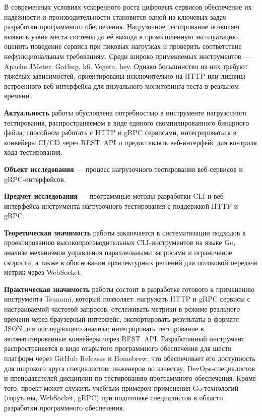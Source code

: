 В современных условиях ускоренного роста цифровых сервисов обеспечение
их надёжности и производительности становится одной из ключевых задач разработки
программного обеспечения.
Нагрузочное тестирование позволяет выявить узкие места системы до её выхода
в промышленную эксплуатацию, оценить поведение сервиса при пиковых нагрузках
и проверить соответствие нефункциональным требованиям.
Среди широко применяемых инструментов --- Apache JMeter, Gatling, k6, Vegeta, hey.
Однако большинство из них требуют тяжёлых зависимостей,
ориентированы исключительно на HTTP или лишены встроенного веб-интерфейса
для визуального мониторинга теста в реальном времени.

\textbf{Актуальность} работы обусловлена потребностью в инструменте
нагрузочного тестирования, распространяемом в виде единого скомпилированного
бинарного файла, способном работать с HTTP и gRPC сервисами,
интегрироваться в конвейеры CI/CD через REST~API
и предоставлять веб-интерфейс для контроля хода тестирования.

\textbf{Объект исследования} --- процесс нагрузочного тестирования веб-сервисов
и gRPC-интерфейсов.

\textbf{Предмет исследования} --- программные методы разработки CLI
и веб-интерфейса инструмента нагрузочного тестирования с поддержкой HTTP и gRPC.

\textbf{Теоретическая значимость} работы заключается в систематизации подходов
к проектированию высокопроизводительных CLI-инструментов на языке Go,
анализе механизмов управления параллельными запросами
и ограничение скорости, а также в обосновании архитектурных решений
для потоковой передачи метрик через WebSocket.

\textbf{Практическая значимость} работы состоит в разработке готового к применению
инструмента Tsunami, который позволяет:
нагружать HTTP и gRPC сервисы с настраиваемой частотой запросов;
отслеживать метрики
в режиме реального времени через браузерный интерфейс;
экспортировать результаты в формате JSON для последующего анализа;
интегрировать тестирование в автоматизированные конвейеры через REST~API.
Разработанный инструмент распространяется в виде открытого программного
обеспечения для шести платформ через GitHub Releases и Homebrew,
что обеспечивает его доступность для широкого круга специалистов:
инженеров по качеству, DevOps-специалистов и преподавателей
дисциплин по тестированию программного обеспечения.
Кроме того, проект может служить учебным примером применения
Go-технологий (горутины, WebSocket, gRPC) при подготовке
специалистов в области разработки программного обеспечения.

